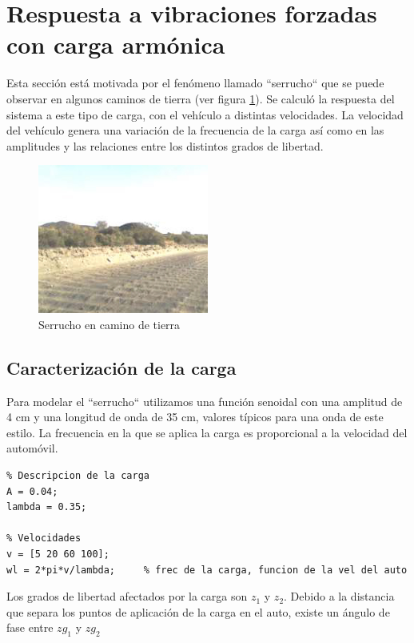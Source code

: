 \documentclass[oneside, a4paper, spanish, links]{amca}
\begin{document}
\newpage
\section{Respuesta a vibraciones forzadas con carga armónica}
\label{sec: vib forz}

Esta sección está motivada por el fenómeno llamado ``serrucho`` que se puede observar en algunos caminos de tierra (ver figura \ref{fig:serrucho}). Se calculó la respuesta del sistema a este tipo de carga, con el vehículo a distintas velocidades. La velocidad del vehículo genera una variación de la frecuencia de la carga así como en las amplitudes y las relaciones entre los distintos grados de libertad.

\begin{figure}[h]
    \centering
    \includegraphics[width=0.5\textwidth]{serruchos.jpg}
    \caption{Serrucho en camino de tierra}
    \label{fig:serrucho}
\end{figure}

\subsection{Caracterización de la carga}

Para modelar el ``serrucho`` utilizamos una función senoidal con una amplitud de 4 cm y una longitud de onda de 35 cm, valores típicos para una onda de este estilo. La frecuencia en la que se aplica la carga es proporcional a la velocidad del automóvil.

\begin{lstlisting}
% Descripcion de la carga
A = 0.04;
lambda = 0.35;

% Velocidades
v = [5 20 60 100];
wl = 2*pi*v/lambda;     % frec de la carga, funcion de la vel del auto

\end{lstlisting}

Los grados de libertad afectados por la carga son $z_1$ y $z_2$. Debido a la distancia que separa los puntos de aplicación de la carga en el auto, existe un ángulo de fase entre $zg_1$ y $zg_2$
\end{document}
